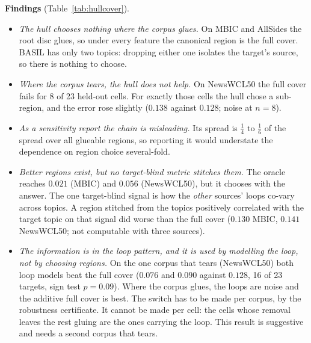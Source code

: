 \documentclass[11pt]{article}
\theoremstyle{definition}
\theoremstyle{remark}
\begin{document}
\textbf{Findings} (Table~\ref{tab:hullcover}).
\begin{itemize}
  \item \emph{The hull chooses nothing where the corpus glues.} On MBIC and AllSides the root disc glues, so under every feature the canonical region is the full cover. BASIL has only two topics: dropping either one isolates the target's source, so there is nothing to choose.
  \item \emph{Where the corpus tears, the hull does not help.} On NewsWCL50 the full cover fails for 8 of 23 held-out cells. For exactly those cells the hull chose a sub-region, and the error rose slightly ($0.138$ against $0.128$; noise at $n=8$).
  \item \emph{As a sensitivity report the chain is misleading.} Its spread is $\tfrac14$ to $\tfrac16$ of the spread over all glueable regions, so reporting it would understate the dependence on region choice several-fold.
  \item \emph{Better regions exist, but no target-blind metric stitches them.} The oracle reaches $0.021$ (MBIC) and $0.056$ (NewsWCL50), but it chooses with the answer. The one target-blind signal is how the \emph{other} sources' loops co-vary across topics. A region stitched from the topics positively correlated with the target topic on that signal did worse than the full cover ($0.130$ MBIC, $0.141$ NewsWCL50; not computable with three sources).
  \item \emph{The information is in the loop pattern, and it is used by modelling the loop, not by choosing regions.} On the one corpus that tears (NewsWCL50) both loop models beat the full cover ($0.076$ and $0.090$ against $0.128$, 16 of 23 targets, sign test $p=0.09$). Where the corpus glues, the loops are noise and the additive full cover is best. The switch has to be made per corpus, by the robustness certificate. It cannot be made per cell: the cells whose removal leaves the rest gluing are the ones carrying the loop. This result is suggestive and needs a second corpus that tears.
\end{itemize}
\end{document}
